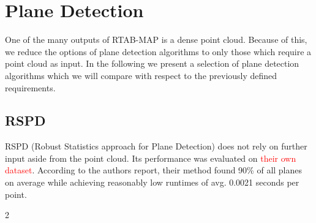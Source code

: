 \documentclass[main.tex]{subfiles}
\begin{document}
\section[Plane Detection]{Plane Detection}
One of the many outputs of RTAB-MAP is a dense point cloud. Because of this, we reduce the options of plane detection
algorithms to only those which require a point cloud as input.
In the following we present a selection of plane detection algorithms which we will compare
with respect to the previously defined requirements.

\subsection*{RSPD}

RSPD (Robust Statistics approach for Plane Detection)\cite{Araújo_Oliveira_2020} does not rely on further input aside from the point cloud.
Its performance was evaluated on \textcolor{red}{their own dataset}. According to the authors report, their method found 90\% of all planes on average while achieving
reasonably low runtimes of avg. 0.0021 seconds per point.


2%
\end{document}
